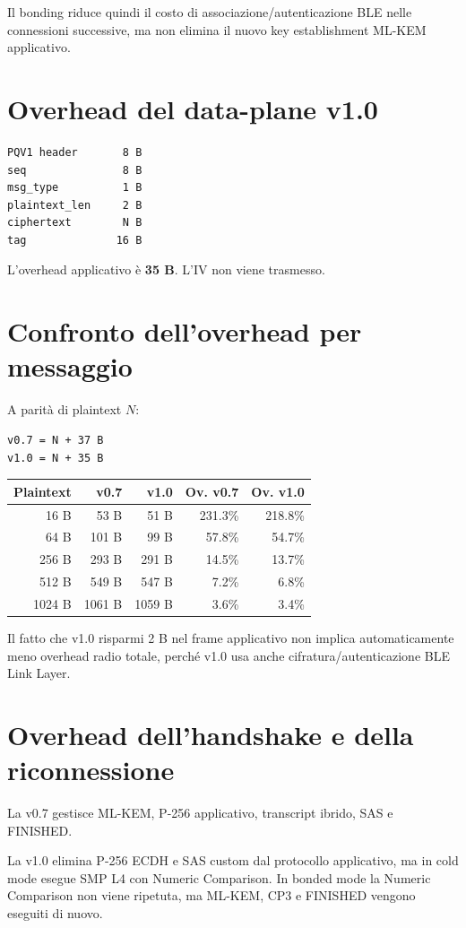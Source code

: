 \documentclass[11pt,a4paper]{article}
\begin{document}
Il bonding riduce quindi il costo di associazione/autenticazione BLE nelle
connessioni successive, ma non elimina il nuovo key establishment ML-KEM applicativo.

\section{Overhead del data-plane v1.0}
\begin{verbatim}
PQV1 header       8 B
seq               8 B
msg_type          1 B
plaintext_len     2 B
ciphertext        N B
tag              16 B
\end{verbatim}

L'overhead applicativo è \textbf{35 B}. L'IV non viene trasmesso.

\section{Confronto dell'overhead per messaggio}
A parità di plaintext $N$:
\begin{verbatim}
v0.7 = N + 37 B
v1.0 = N + 35 B
\end{verbatim}

\begin{center}
\begin{tabular}{rrrrr}
\toprule
Plaintext & v0.7 & v1.0 & Ov. v0.7 & Ov. v1.0 \\
\midrule
16 B   & 53 B   & 51 B   & 231.3\% & 218.8\% \\
64 B   & 101 B  & 99 B   & 57.8\%  & 54.7\%  \\
256 B  & 293 B  & 291 B  & 14.5\%  & 13.7\%  \\
512 B  & 549 B  & 547 B  & 7.2\%   & 6.8\%   \\
1024 B & 1061 B & 1059 B & 3.6\%   & 3.4\%   \\
\bottomrule
\end{tabular}
\end{center}

Il fatto che v1.0 risparmi 2 B nel frame applicativo non implica automaticamente
meno overhead radio totale, perché v1.0 usa anche cifratura/autenticazione BLE Link Layer.

\section{Overhead dell'handshake e della riconnessione}
La v0.7 gestisce ML-KEM, P-256 applicativo, transcript ibrido, SAS e FINISHED.

La v1.0 elimina P-256 ECDH e SAS custom dal protocollo applicativo, ma in cold mode
esegue SMP L4 con Numeric Comparison. In bonded mode la Numeric Comparison non viene
ripetuta, ma ML-KEM, CP3 e FINISHED vengono eseguiti di nuovo.
\end{document}
